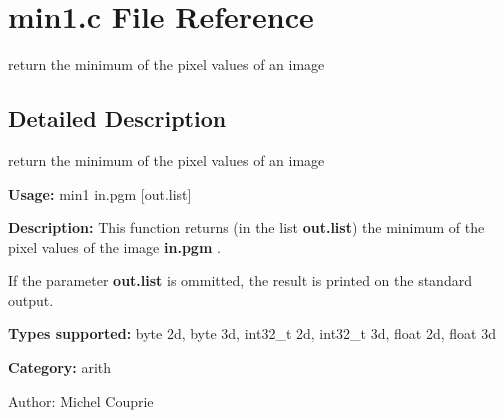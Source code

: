 \section{min1.c File Reference}
\label{min1_8c}
return the minimum of the pixel values of an image  




\label{_details}
\subsection{Detailed Description}
return the minimum of the pixel values of an image 

{\bf Usage:} min1 in.pgm [out.list]

{\bf Description:} This function returns (in the list {\bf out.list}) the minimum of the pixel values of the image {\bf in.pgm} .

If the parameter {\bf out.list} is ommitted, the result is printed on the standard output.

{\bf Types supported:} byte 2d, byte 3d, int32\_\-t 2d, int32\_\-t 3d, float 2d, float 3d

{\bf Category:} arith

\begin{Desc}
\item[Author:]Michel Couprie \end{Desc}

